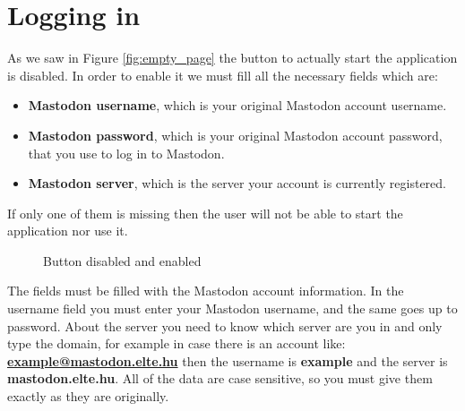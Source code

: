 \section{Logging in}
\label{s:Logging_in}
As we saw in Figure \ref{fig:empty_page} the button to actually start the application is disabled.
In order to enable it we must fill all the necessary fields which are:
\begin{itemize}
	\item \textbf{Mastodon username}, which is your original Mastodon account username.
	\item \textbf{Mastodon password}, which is your original Mastodon account password, that you use to log in to Mastodon.
	\item \textbf{Mastodon server}, which is the server your account is currently registered.
\end{itemize}

If only one of them is missing then the user will not be able
to start the application nor use it. 
\begin{figure}[H]
	\centering
	\hspace{5pt}
	\caption{Button disabled and enabled}
	\label{fig:buttonenabled}
\end{figure}
The fields must be filled with the Mastodon account information.
In the username field you must enter your Mastodon username, and the
same goes up to password. About the server you need to know which server
are you in and only type the domain, for example in case there is an account
like: \textbf{\url{example@mastodon.elte.hu}} then the username is \textbf{example} and the server is
\textbf{mastodon.elte.hu}. All of the data are case sensitive, so you must give them
exactly as they are originally.

